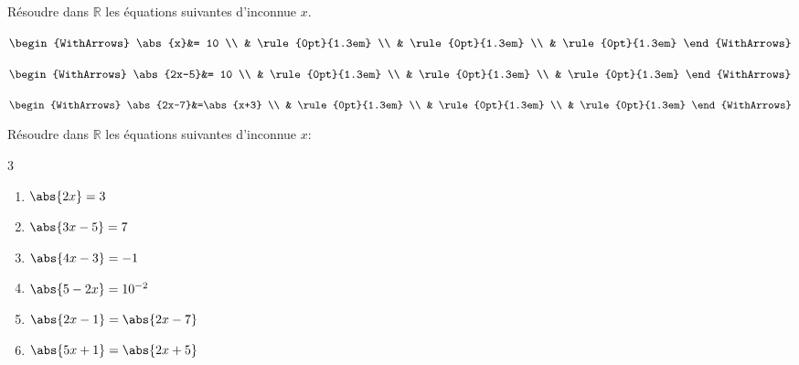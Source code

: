 %	 
\newpage 
\begin{example} Résoudre dans $\mathbb{R}$ les équations suivantes d'inconnue $x$.
	
	\noindent \parbox{0.25\linewidth}{	
		$\begin{WithArrows}
			\abs{x}&=  10 \\ 
			& \rule{0pt}{1.3em}  \\
			&  \rule{0pt}{1.3em} \\
			&   \rule{0pt}{1.3em}  
		\end{WithArrows}$ 	
	}\hfill \parbox{0.25\linewidth}{	
		$\begin{WithArrows}
			\abs{2x-5}&=  10 \\ 
			& \rule{0pt}{1.3em}  \\
			&  \rule{0pt}{1.3em} \\
			&   \rule{0pt}{1.3em}  
		\end{WithArrows}$ 	
	}\hfill \parbox{0.40\linewidth}{	
		$\begin{WithArrows}
			\abs{2x-7}&=\abs{x+3} \\ 
			& \rule{0pt}{1.3em}  \\
			&  \rule{0pt}{1.3em} \\
			&   \rule{0pt}{1.3em}  
		\end{WithArrows}$ 	
	} 
\end{example}
\begin{exercise}\label{chapter07:exercice:equationC} Résoudre dans $\mathbb{R}$ les équations suivantes d'inconnue $x$: \hfill  
	\begin{multicols}{3}
		\begin{enumerate}[label={$(E_{\arabic*})$}, leftmargin=*]
			\item  $\abs{2x}=3$
			\item  $\abs{3x-5}=7$
			\item  $\abs{4x-3}=-1$
			\item  $\abs{5-2x}=10^{-2}$
			\item  $\abs{2x-1}=\abs{2x-7}$
			\item  $\abs{5x+1}=\abs{2x+5}$
		\end{enumerate}
	\end{multicols} 	
\end{exercise}
